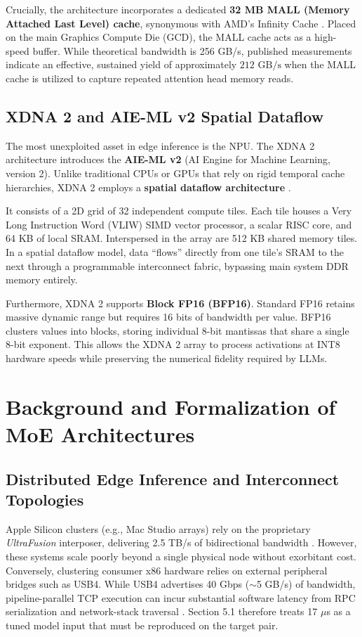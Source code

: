 \documentclass[11pt,a4paper]{article}
\begin{document}
Crucially, the architecture incorporates a dedicated \textbf{32 MB MALL (Memory Attached Last Level) cache}, synonymous with AMD's Infinity Cache \cite{ryzen16core}. Placed on the main Graphics Compute Die (GCD), the MALL cache acts as a high-speed buffer. While theoretical bandwidth is 256 GB/s, published measurements indicate an effective, sustained yield of approximately $212 \text{ GB/s}$ when the MALL cache is utilized to capture repeated attention head memory reads.

\subsection{XDNA 2 and AIE-ML v2 Spatial Dataflow}
The most unexploited asset in edge inference is the NPU. The XDNA 2 architecture introduces the \textbf{AIE-ML v2} (AI Engine for Machine Learning, version 2). Unlike traditional CPUs or GPUs that rely on rigid temporal cache hierarchies, XDNA 2 employs a \textbf{spatial dataflow architecture} \cite{xdna2}.

It consists of a 2D grid of 32 independent compute tiles. Each tile houses a Very Long Instruction Word (VLIW) SIMD vector processor, a scalar RISC core, and 64 KB of local SRAM. Interspersed in the array are 512 KB shared memory tiles. In a spatial dataflow model, data ``flows'' directly from one tile's SRAM to the next through a programmable interconnect fabric, bypassing main system DDR memory entirely.

Furthermore, XDNA 2 supports \textbf{Block FP16 (BFP16)}. Standard FP16 retains massive dynamic range but requires 16 bits of bandwidth per value. BFP16 clusters values into blocks, storing individual 8-bit mantissas that share a single 8-bit exponent. This allows the XDNA 2 array to process activations at INT8 hardware speeds while preserving the numerical fidelity required by LLMs.

\section{Background and Formalization of MoE Architectures}

\subsection{Distributed Edge Inference and Interconnect Topologies}
Apple Silicon clusters (e.g., Mac Studio arrays) rely on the proprietary \textit{UltraFusion} interposer, delivering 2.5 TB/s of bidirectional bandwidth \cite{apple_unified}. However, these systems scale poorly beyond a single physical node without exorbitant cost. Conversely, clustering consumer x86 hardware relies on external peripheral bridges such as USB4. While USB4 advertises 40 Gbps ($\sim$5 GB/s) of bandwidth, pipeline-parallel TCP execution can incur substantial software latency from RPC serialization and network-stack traversal \cite{llama_rpc}. Section 5.1 therefore treats 17 $\mu$s as a tuned model input that must be reproduced on the target pair.
\end{document}
